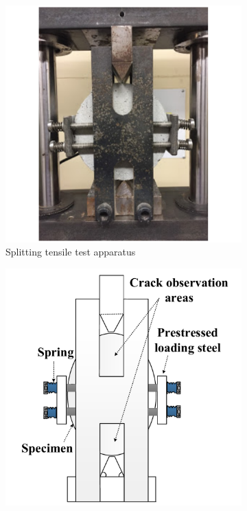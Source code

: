 \documentclass[11pt]{article}
\begin{document}
		\begin{figure}[!h]
		\centering
		\begin{subfigure}{0.31\textwidth}
			\centering
			\includegraphics[width = \linewidth]{CR2}
			\caption{Splitting tensile test apparatus}
		\end{subfigure}
	\hspace{-0.1em}
		\begin{subfigure}{0.31\textwidth}
		\centering
		\includegraphics[width = \linewidth]{CR1}

\end{subfigure}
\end{figure}
\end{document}
